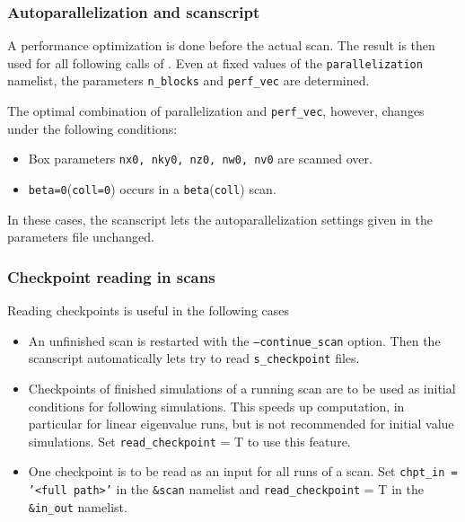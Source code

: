 \documentclass[12pt]{article}
\begin{document}
\subsubsection{Autoparallelization and scanscript}

A performance optimization is done before the actual scan. The
result is then used for all following calls of \gene. Even at fixed
values of the \texttt{parallelization} namelist, the parameters \texttt{n\_blocks} and \texttt{perf\_vec} are determined.

The optimal combination of parallelization and \texttt{perf\_vec},
however, changes under the following conditions:
\begin{itemize}
\item Box parameters \texttt{nx0, nky0, nz0, nw0, nv0} are scanned over.
\item \texttt{beta=0}(\texttt{coll=0}) occurs in a \texttt{beta}(\texttt{coll}) scan.
\end{itemize}

In these cases, the scanscript lets the autoparallelization settings
given in the parameters file unchanged.

\subsubsection{Checkpoint reading in scans}

Reading checkpoints is useful in the following cases

\begin{itemize}
\item An unfinished scan is restarted with the \texttt{--continue\_scan}
option. Then the scanscript automatically lets \gene try to read \texttt{s\_checkpoint} files.

\item Checkpoints of finished \gene simulations of a running scan are to
be used as initial conditions for following simulations. This
speeds up computation, in particular for linear eigenvalue runs, but is
not recommended for initial value simulations. Set
\texttt{read\_checkpoint} = T to use this feature.

\item One checkpoint is to be read as an input for all runs of a scan.
Set \texttt{chpt\_in = '<full path>'} in the \texttt{\&scan} namelist and
\texttt{read\_checkpoint} = T in the \texttt{\&in\_out} namelist.
\end{itemize}

\newpage
\end{document}
